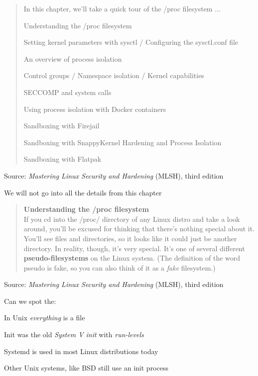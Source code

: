 \documentclass[Screen16to9,17pt]{foils}
\begin{document}
\begin{quote}
In this chapter, we’ll take a quick tour of the /proc filesystem ...

\begin{list2}
\item Understanding the /proc filesystem
\item Setting kernel parameters with sysctl / Configuring the sysctl.conf file
\item An overview of process isolation
\item Control groups / Namespace isolation / Kernel capabilities
\item SECCOMP and system calls
\item Using process isolation with Docker containers
\item Sandboxing with Firejail
\item Sandboxing with SnappyKernel Hardening and Process Isolation
\item Sandboxing with Flatpak
\end{list2}
\end{quote}
Source: \emph{Mastering Linux Security and Hardening} (MLSH), third edition

We will not go into all the details from this chapter



\begin{quote}{\bf
Understanding the /proc filesystem}\\
If you cd into the /proc/ directory of any Linux distro and take a look around, you’ll be excused for thinking that there’s nothing special about it. You’ll see files and directories, so it looks like it could just be another directory. In reality, though, it’s very special. It’s one of several different {\bf pseudo-filesystems} on the Linux system. (The definition of the word pseudo is fake, so you can also think of it as a \emph{fake} filesystem.)

\end{quote}
Source: \emph{Mastering Linux Security and Hardening} (MLSH), third edition

Can we spot the:
\begin{list2}
\item In Unix \emph{everything} is a file
\item Init was the old \emph{System V init} with \emph{run-levels}
\item Systemd is used in most Linux distributions today
\item Other Unix systems, like BSD still use an init process
\end{list2}
\end{document}

